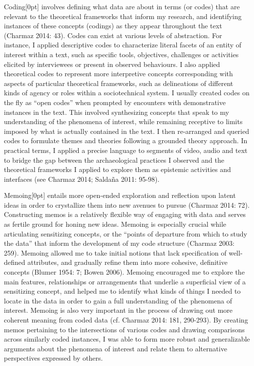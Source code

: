 \documentclass[
]{article}
\newcommand{\paragraphnumber}[1]{\marginnote{\color{lightgray}\tiny{#1}}[0pt]}
\begin{document}
Coding\paragraphnumber{[38]} involves defining what data are about in
terms (or codes) that are relevant to the theoretical frameworks that
inform my research, and identifying instances of these concepts
(codings) as they appear throughout the text (Charmaz 2014: 43). Codes
can exist at various levels of abstraction. For instance, I applied
descriptive codes to characterize literal facets of an entity of
interest within a text, such as specific tools, objectives, challenges
or activities elicited by interviewees or present in observed
behaviours. I also applied theoretical codes to represent more
interpretive concepts corresponding with aspects of particular
theoretical frameworks, such as delineations of different kinds of
agency or roles within a sociotechnical system. I usually created codes
on the fly as ``open codes'' when prompted by encounters with
demonstrative instances in the text. This involved synthesizing concepts
that speak to my understanding of the phenomena of interest, while
remaining receptive to limits imposed by what is actually contained in
the text. I then re-arranged and queried codes to formulate themes and
theories following a grounded theory approach. In practical terms, I
applied a precise language to segments of video, audio and text to
bridge the gap between the archaeological practices I observed and the
theoretical frameworks I applied to explore them as epistemic activities
and interfaces (see Charmaz 2014; Saldaña 2011: 95-98).

Memoing\paragraphnumber{[39]} entails more open-ended exploration and
reflection upon latent ideas in order to crystallize them into new
avenues to pursue (Charmaz 2014: 72). Constructing memos is a relatively
flexible way of engaging with data and serves as fertile ground for
honing new ideas. Memoing is especially crucial while articulating
sensitizing concepts, or the ``points of departure from which to study
the data'' that inform the development of my code structure (Charmaz
2003: 259). Memoing allowed me to take initial notions that lack
specification of well-defined attributes, and gradually refine them into
more cohesive, definitive concepts (Blumer 1954: 7; Bowen 2006). Memoing
encouraged me to explore the main features, relationships or
arrangements that underlie a superficial view of a sensitizing concept,
and helped me to identify what kinds of things I needed to locate in the
data in order to gain a full understanding of the phenomena of interest.
Memoing is also very important in the process of drawing out more
coherent meaning from coded data (cf. Charmaz 2014: 181, 290-293). By
creating memos pertaining to the intersections of various codes and
drawing comparisons across similarly coded instances, I was able to form
more robust and generalizable arguments about the phenomena of interest
and relate them to alternative perspectives expressed by others.
\end{document}
